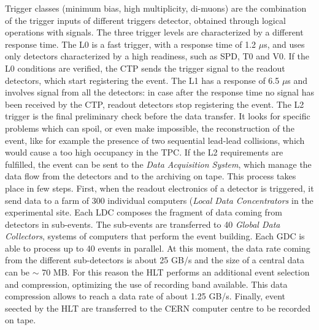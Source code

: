 Trigger classes (minimum bias, high multiplicity, di-muons) are the combination of the trigger inputs of different triggers detector, obtained through logical operations with signals. The three trigger levels are characterized by a different response time. The L0 is a fast trigger, with a response time of 1.2 $\mu$s, and uses only detectors characterized by a high readiness, such as SPD, T0 and V0. If the L0 conditions are verified, the CTP sends the trigger signal to the readout detectors, which start registering the event. The L1 has a response of 6.5 $\mu$s and involves signal from all the detectors: in case after the response time no signal has been received by the CTP, readout detectors stop registering the event. The L2 trigger is the final preliminary check before the data transfer. It looks for specific problems which can spoil, or even make impossible, the reconstruction of the event, like for example the presence of two sequential lead-lead collisions, which would cause a too high occupancy in the TPC. If the L2 requirements are fulfilled, the event can be sent to the \textit{Data Acquisition System}, which manage the data flow from the detectors and to the archiving on tape. This process takes place in few steps. First, when the readout electronics of a detector is triggered, it send data to a farm of 300 individual computers (\textit{Local Data Concentrators} in the experimental site. Each LDC composes the fragment of data coming from detectors in sub-events. The sub-events are transferred to 40 \textit{Global Data Collectors}, systems of computers that perform the event building. Each GDC is able to process up to 40 events in parallel. At this moment, the data rate coming from the different sub-detectors is about 25 GB/s and the size of a central data can be $\sim$ 70 MB. For this reason the HLT performs an additional event selection and compression, optimizing the use of recording band available. This data compression allows to reach a data rate of about 1.25 GB/s. Finally, event seected by the HLT are transferred to the CERN computer centre to be recorded on tape.
